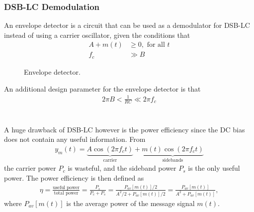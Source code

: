 \documentclass{report}
\begin{document}
\subsubsection{DSB-LC Demodulation}
An envelope detector is a circuit that can be used as a demodulator for DSB-LC instead of using a carrier oscillator, given the conditions that 
\begin{align}
    A + m(t) &\geq 0, \text{ for all } t \\
    f_c &\gg B
\end{align}
\begin{figure}[!hbt]
    \centering
    \caption{Envelope detector.}
\end{figure}

An additional design parameter for the envelope detector is that 
\begin{align}
    2\pi B < \frac{1}{RC} \ll 2\pi f_c
\end{align}
\\ \\
A huge drawback of DSB-LC however is the power efficiency since the DC bias does not contain any 
useful information. From
\begin{align}
    y_m(t) = \underbrace{A\cos(2\pi f_c t)}_{\text{carrier}} + \underbrace{m(t)\cos(2\pi f_c t)}_{\text{sidebands}}
\end{align}
the carrier power $P_c$ is wasteful, and the sideband power $P_s$ is the only useful power. The power efficiency is then defined as 
\begin{align}
    \eta = \frac{\text{useful power}}{\text{total power}} = \frac{P_s}{P_c + P_s} = \frac{P_{av}[m(t)]/2}{A^2/2 + P_{av}[m(t)]/2} = \frac{P_{av}[m(t)]}{A^2 + P_{av}[m(t)]},
\end{align}
where $P_{av}[m(t)]$ is the average power of the message signal $m(t)$.
\end{document}
